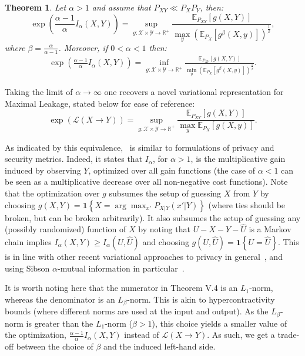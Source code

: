 \documentclass{article}
\newtheorem{theorem}{Theorem}
\numberwithin{theorem}{section}
\numberwithin{example}{section}
\numberwithin{remark}{section}
\numberwithin{definition}{section}
\newcommand{\E}{\mathbb{E}}
\newcommand{\X}{\mathcal{X}}
\newcommand{\Y}{\mathcal{Y}}
\newcommand{\ml}[2]{\mathcal{L}\left(#1  \!\!  \to  \!\!   #2\right)} %
\newcommand{\revised}[1]{{\color{black} #1}}
\begin{document}
\begin{theorem}\label{thm:varReprIalpha}
Let $\alpha>1$ and assume that $P_{XY}\ll P_XP_Y$, then: 
\begin{equation}
\exp\left(\!\frac{\alpha-1}{\alpha}I_\alpha(X,Y)\!\right)\!\! =\!\!\! \!\!\sup_{g:\X\times\mathcal{Y}\to\mathbb{R}^+}\! \frac{\E_{P_{XY}}[g(X,Y)]}{\max_y \left(\E_{P_X}[g^\beta(X,y)]\right)^\frac1\beta },\label{eq:varReprIalpha1}
\end{equation}
where $\beta=\frac{\alpha}{\alpha-1}$.
Moreover, if $0<\alpha<1$ then:
\begin{align}
\exp\left(\!\frac{\alpha-1}{\alpha}I_\alpha(X,Y)\!\right) \!\! =\!\!\! \!\! 
\inf_{g:\X\times\mathcal{Y}\to\mathbb{R}^+}\! \frac{\E_{P_{XY}}[g(X,Y)]}{\min_y \left(\E_{P_X}[g^\beta(X,y)]\right)^\frac1\beta }.\label{eq:varReprIalpha1Neg}
\end{align}
\end{theorem}



Taking the limit of $\alpha\to\infty$ one recovers a novel variational representation for Maximal Leakage, stated below for ease of reference:
\begin{equation}
    \exp\left(\ml{X}{Y}\right) = \sup_{g:\X\times\Y\to\mathbb{R^+}} \frac{\E_{P_{XY}}[g(X,Y)]}{\max_y \E_{P_X}[g(X,y)]}. \label{eq:varReprLeakage}
\end{equation}


\revised{
As indicated by this equivalence,~\Cref{thm:varReprIalpha} is similar to formulations of privacy and security metrics. Indeed, it states that $I_\alpha$, for $\alpha >1$, is the multiplicative gain induced by observing $Y$, optimized over all gain functions (the case of $\alpha <1$ can be seen as a multiplicative decrease over all non-negative cost functions). Note that the optimization over $g$ subsumes the setup of guessing $X$ from $Y$ by choosing $g(X,Y) = \mathbf{1} \left\lbrace X = \arg \max_{x'} P_{X|Y}(x'|Y) \right\rbrace$
 (where ties should be broken, but can be broken arbitrarily). It also subsumes the setup of guessing any (possibly randomized) function of $X$ by noting that $U-X-Y-\hat{U}$ is a Markov chain implies $I_\alpha(X,Y) \geq I_\alpha (U,\hat{U})$ and choosing $g(U,\hat{U}) = \mathbf{1} \left\lbrace U = \hat{U} \right\rbrace$. This is in line with other recent variational approaches to privacy in general~\cite{lin2024graph,rodriguez2021variational}, and using Sibson $\alpha$-mutual information in particular~\cite{kamatsuka2025several,ding2024alpha}.
 
 It is worth noting here that the numerator in Theorem V.4 is an $L_1$-norm, whereas the denominator is an $L_\beta$-norm. This is akin to hypercontractivity bounds (where different norms are used at the input and output). As the $L_\beta$-norm is greater than the $L_1$-norm ($\beta >1$), this choice yields a smaller value of the optimization, $\frac{\alpha-1}{\alpha}I_\alpha(X,Y)$ instead of $\ml{X}{Y}$. As such, we get a trade-off between the choice of $\beta$ and the induced left-hand side.}
\end{document}
